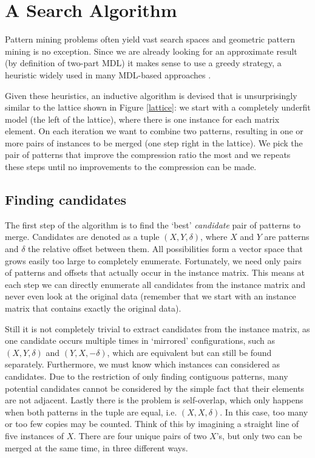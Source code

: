 \documentclass{llncs}
\begin{document}
\section{A Search Algorithm}

Pattern mining problems often yield vast search spaces and geometric pattern mining is no exception. Since we are already looking for an approximate result (by definition of two-part MDL) it makes sense to use a greedy strategy, a heuristic widely used in many MDL-based approaches \cite{krimp,slim,classy}. 


Given these heuristics, an inductive algorithm is devised that is unsurprisingly similar to the lattice shown in Figure \ref{lattice}:  we start with a completely underfit model (the left of the lattice), where there is one instance for each matrix element. On each iteration we want to combine two patterns, resulting in one or more pairs of instances to be merged (one step right in the lattice). We pick the pair of patterns that improve the compression ratio the most and we repeats these steps until no improvements to the compression can be made.

\subsection{Finding candidates}

The first step of the algorithm is to find the `best' \emph{candidate} pair of patterns to merge. Candidates are denoted as a tuple $(X,Y,\delta)$, where $X$ and $Y$ are patterns and $\delta$ the relative offset between them. All possibilities form a vector space that grows easily too large to completely enumerate. Fortunately, we need only pairs of patterns and offsets that actually occur in the instance matrix. This means at each step we can directly enumerate all candidates from the instance matrix and never even look at the original data (remember that we start with an instance matrix that contains exactly the original data).  

Still it is not completely trivial to extract candidates from the instance matrix, as one candidate occurs multiple times in `mirrored' configurations, such as $(X,Y,\delta)$ and $(Y,X,-\delta)$, which are equivalent but can still be found separately. Furthermore, we must know which instances can considered as candidates. Due to the restriction of only finding contiguous patterns, many potential candidates cannot be considered by the simple fact that their elements are not adjacent. Lastly there is the problem is self-overlap, which only happens when both patterns in the tuple are equal, i.e. $(X,X,\delta)$. In this case, too many or too few copies may be counted. Think of this by imagining a straight line of five instances of $X$. There are four unique pairs of two $X$'s, but only two can be merged at the same time, in three different ways.
\end{document}
